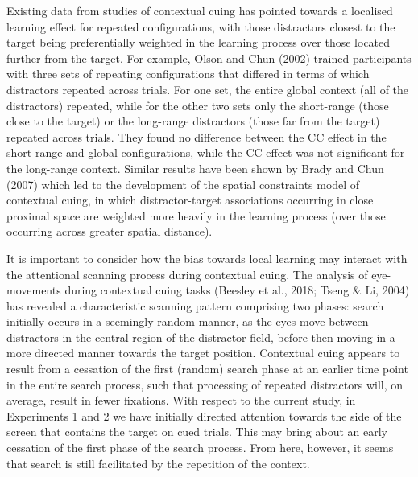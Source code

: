 \documentclass[
  man,floatsintext]{apa7}
\begin{document}
Existing data from studies of contextual cuing has pointed towards a localised learning effect for repeated configurations, with those distractors closest to the target being preferentially weighted in the learning process over those located further from the target. For example, Olson and Chun (2002) trained participants with three sets of repeating configurations that differed in terms of which distractors repeated across trials. For one set, the entire global context (all of the distractors) repeated, while for the other two sets only the short-range (those close to the target) or the long-range distractors (those far from the target) repeated across trials. They found no difference between the CC effect in the short-range and global configurations, while the CC effect was not significant for the long-range context. Similar results have been shown by Brady and Chun (2007) which led to the development of the spatial constraints model of contextual cuing, in which distractor-target associations occurring in close proximal space are weighted more heavily in the learning process (over those occurring across greater spatial distance).

It is important to consider how the bias towards local learning may interact with the attentional scanning process during contextual cuing. The analysis of eye-movements during contextual cuing tasks (Beesley et al., 2018; Tseng \& Li, 2004) has revealed a characteristic scanning pattern comprising two phases: search initially occurs in a seemingly random manner, as the eyes move between distractors in the central region of the distractor field, before then moving in a more directed manner towards the target position. Contextual cuing appears to result from a cessation of the first (random) search phase at an earlier time point in the entire search process, such that processing of repeated distractors will, on average, result in fewer fixations. With respect to the current study, in Experiments 1 and 2 we have initially directed attention towards the side of the screen that contains the target on cued trials. This may bring about an early cessation of the first phase of the search process. From here, however, it seems that search is still facilitated by the repetition of the context.
\end{document}
